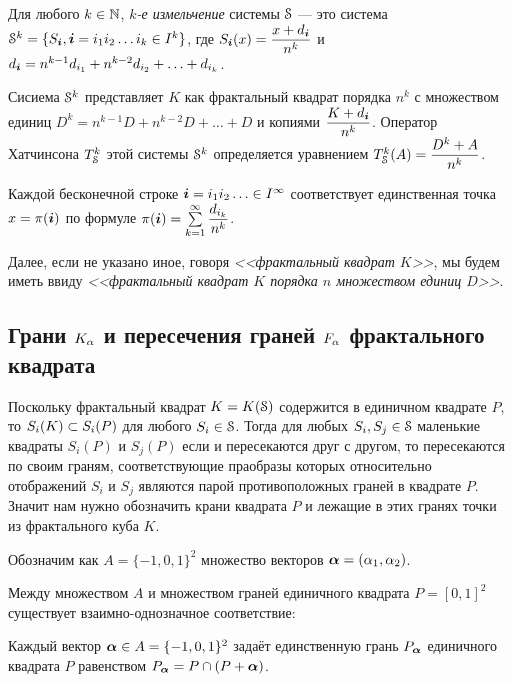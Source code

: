 \begin{definition}\label{refin}
 Для любого $k\in \mathbb{N}$, {\em $k$-е измельчение} системы ${\EuScript S}$ --- это система ${\EuScript S}^k=\{S_{\bm{i}}, {\bm{i}}=i_1i_2\ldots i_k\in I^k\}$, где $S_{\bm{i}}(x)=\dfrac{x+d_{\bm{i}}}{n^k}$ и $d_{\bm{i}}=n^{k-1}d_{i_1}+n^{k-2}d_{i_2}+\ldots+d_{i_k}$. 
\end{definition}

Сисиема ${\EuScript S}^k$ представляет $K$ как фрактальный квадрат порядка $n^k$ с множеством единиц $D^k=n^{k-1}D+n^{k-2}D+\ldots+D$ и копиями $\dfrac{K+d_{\bm{i}}}{n^k}$.
Оператор Хатчинсона $T_{\EuScript S}^k$ этой системы ${\EuScript S}^k$ определяется уравнением $T_{\EuScript S}^k(A)=\dfrac{D^k+A}{n^k}$.

Каждой бесконечной строке ${\bm{i}}=i_1i_2\ldots\in I^\infty$ соответствует единственная точка $x=\pi({\bm{i}})$ по формуле $\pi({\bm{i}})=\sum\limits_{k=1}^\infty \dfrac{d_{i_k}}{n^k}$.

\begin{remark}%
Далее, если не указано иное, говоря {\em <<фрактальный квадрат $K$>>}, мы будем иметь ввиду {\em <<фрактальный квадрат $K$ порядка $n$ множеством единиц $D$>>}. 
\end{remark}


\subsection{Грани $K_\alpha$ и пересечения граней $F_\alpha$ фрактального квадрата}

Поскольку фрактальный квадрат $K=K({\EuScript S})$ содержится в единичном квадрате $P$, то $S_i(K)\subset S_i(P)$ для любого $S_i\in{\EuScript S}$.
Тогда для любых $S_i, S_j\in{\EuScript S}$ маленькие квадраты $S_i(P)$ и $S_j(P)$ если и пересекаются друг с другом, то пересекаются по своим граням, соответствующие праобразы которых относительно отображений $S_i$ и $S_j$ являются парой противоположных граней в квадрате $P$.
Значит нам нужно обозначить крани квадрата $P$ и лежащие в этих гранях точки из фрактального куба $K$.


\begin{definition}\label{setA}
Обозначим как $A=\{-1,0,1\}^2$ множество векторов ${\bm{\alpha}}=(\alpha_1,\alpha_2)$. 
\end{definition}

Между множеством $A$ и множеством граней единичного квадрата $P=[0,1]^2$ существует взаимно-однозначное соответствие:

\begin{definition}\label{dfn:Pa}
Каждый вектор ${\bm{\alpha}}\in A=\{-1,0,1\}^2$ задаёт единственную грань $P_{\bm{\alpha}}$ единичного квадрата $P$ равенством $P_{\bm{\alpha}}=P\cap(P+{\bm{\alpha}})$.
\end{definition}

